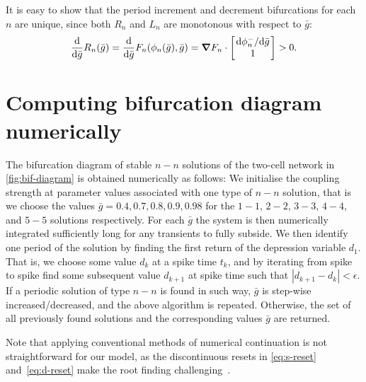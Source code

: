\documentclass[12pt,authoryear]{elsarticle}
\newcommand{\gbar}{\bar g}
\newcommand{\phin}{\phi_n}
\begin{document}
It is easy to show that the period increment and decrement bifurcations for each $n$ are unique, since both $R_{n}$ and $L_{n}$ are monotonous with respect to $\gbar$:
\begin{align}
  \dv{\gbar}R_{n}(\gbar) = \dv{\gbar}F_{n}(\phin(\gbar), \gbar) = \grad F_{n} \cdot \begin{bmatrix}\dv*{\phin^{-}}{\gbar}\\ 1\end{bmatrix} > 0.
\end{align}






\section*{Computing bifurcation diagram numerically}
The bifurcation diagram of stable $n-n$ solutions of the two-cell network in \cref{fig:bif-diagram} is obtained numerically as follows:
We initialise the coupling strength at parameter values associated with one type of $n-n$ solution, that is we choose the values $\bar g = 0.4, 0.7, 0.8, 0.9, 0.98$ for the $1-1$, $2-2$, $3-3$, $4-4$, and $5-5$ solutions respectively.
For each $\bar g$ the system is then numerically integrated sufficiently long for any transients to fully subside.
We then identify one period of the solution by finding the first return of the depression variable $d_{1}$.
That is, we choose some value $d_{k}$ at a spike time $t_{k}$, and by iterating from spike to spike find some subsequent value $d_{k+1}$ at spike time such that $|d_{k+1}-d_{k}|<\epsilon$.
If a periodic solution of type $n-n$ is found in such way, $\bar g$ is step-wise increased/decreased, and the above algorithm is repeated.
Otherwise, the set of all previously found solutions and the corresponding values $\bar g$ are returned.

Note that applying conventional methods of numerical continuation is not straightforward for our model, as the discontinuous resets in \cref{eq:s-reset} and~\eqref{eq:d-reset} make the root finding challenging~\citep[e.g. see][ for continuation methods]{kuznetsov2004}.



\end{document}

